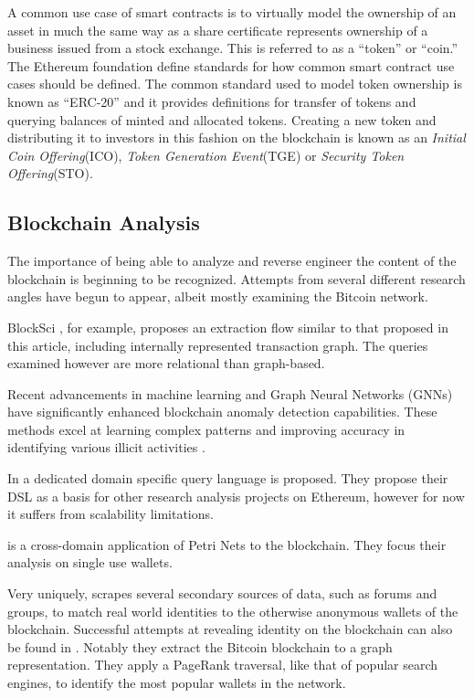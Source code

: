 \documentclass[conference]{IEEEtran}
\begin{document}
A common use case of smart contracts is to virtually model the ownership of an asset in much the same way as a share certificate represents ownership of a business issued from a stock exchange.  This is referred to as a ``token'' or ``coin.'' The Ethereum foundation define standards for how common smart contract use cases should be defined.  The common standard used to model token ownership is known as ``ERC-20'' \cite{vogelsteller2018erc} and it provides definitions for transfer of tokens and querying balances of minted and allocated tokens. %
Creating a new token and distributing it to investors in this fashion on the blockchain is known as an \emph{Initial Coin Offering}(ICO),  \emph{Token Generation Event}(TGE) or \emph{Security Token Offering}(STO).

\subsection{Blockchain Analysis}
The importance of being able to analyze and reverse engineer the content of the blockchain is beginning to be recognized. Attempts from several different research angles have begun to appear, albeit mostly examining the Bitcoin network.  

BlockSci \cite{kalodner2017blocksci}, for example, proposes an extraction flow similar to that proposed in this article, including internally represented transaction graph.  The queries examined however are more relational than graph-based.

Recent advancements in machine learning and Graph Neural Networks (GNNs) have significantly enhanced blockchain anomaly detection capabilities.
These methods excel at learning complex patterns and improving accuracy in identifying various illicit activities \cite{Chen2024Phishing, Harper2025STGNN, Gu2025Ensemble, Sultana2025GNN}.

In \cite{bragagnolo2018ethereum} a dedicated domain specific query language is proposed.  They propose their DSL as a basis for other research analysis projects on Ethereum, however for now it suffers from scalability limitations.

\cite{pinna2017petri} is a cross-domain application of Petri Nets to the blockchain.  They focus their analysis on single use wallets.

Very uniquely, \cite{spagnuolo2014bitiodine} scrapes several secondary sources of data, such as forums and groups, to match real world identities to the otherwise anonymous wallets of the blockchain.  Successful attempts at revealing identity on the blockchain can also be found in \cite{fleder2015bitcoin}. Notably they extract the Bitcoin blockchain to a graph representation. They apply a PageRank\cite{page1999pagerank} traversal, like that of popular search engines, to identify the most popular wallets in the network.
\end{document}
